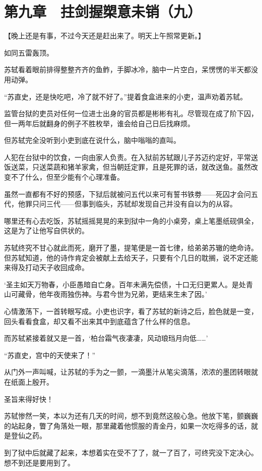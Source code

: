 \section{第九章　拄剑握槊意未销（九）}

【晚上还是有事，不过今天还是赶出来了。明天上午照常更新。】

如同五雷轰顶。

苏轼看着眼前排得整整齐齐的鱼鲊，手脚冰冷，脑中一片空白，呆愣愣的半天都没用动弹。

“苏直史，还是快吃吧，冷了就不好了。”提着食盒进来的小吏，温声劝着苏轼。

监管台狱的吏员对任何一位进士出身的官员都是彬彬有礼。尽管现在成了阶下囚，但一两年后就翻身的例子不胜枚举，谁会给自己日后找麻烦。

但苏轼完全没听到小吏到底在说什么，脑中嗡嗡的直叫。

人犯在台狱中的饮食，一向由家人负责。在入狱前苏轼跟儿子苏迈约定好，平常送饭送菜，只送菜蔬和猪羊家禽，但当朝廷定罪，且是死罪的话，就改送鱼。虽然改变不了什么，但至少能有个心理准备。

虽然一直都有不好的预感，下狱后就被问五代以来可有誓书铁劵——死囚才会问五代，他罪只问三代——但事到临头，苏轼却发现自己并没有自以为的从容。

哪里还有心去吃饭，苏轼摇摇晃晃的来到狱中一角的小桌旁，桌上笔墨纸砚俱全，这是为了让他写自供状的。

苏轼终究不甘心就此而死，磨开了墨，提笔便是一首七律，给弟弟苏辙的绝命诗。但苏轼知道，他的诗作肯定会被献上去给天子，只要有个几日的耽搁，说不定还能来得及打动天子收回成命。

‘圣主如天万物春，小臣愚暗自亡身。百年未满先偿债，十口无归更累人。是处青山可藏骨，他年夜雨独伤神。与君今世为兄弟，更结来生未了因。’

心情激荡下，一首转眼写成。小吏也识字，看了苏轼的新诗之后，脸色就是一变，回头看看食盒，却又看不出来其中到底蕴含了什么样的信息。

而苏轼紧接着就又是一首，‘柏台霜气夜凄凄，风动琅珰月向低……’

“苏直史，宫中的天使来了！”

从门外一声叫喊，让苏轼的手为之一颤，一滴墨汁从笔尖滴落，浓浓的墨团转眼就在纸面上殷开。

圣旨来得好快！

苏轼惨然一笑，本以为还有几天的时间，想不到竟然这般心急。他放下笔，颤巍巍的站起身，瞥了角落处一眼，那里藏着他惯服的青金丹，如果一次吃得多的话，就是登仙之药。

到了狱中后就藏了起来，本想着实在受不了了，就一了百了，可终究没下定决心。想不到还是要用到了。

